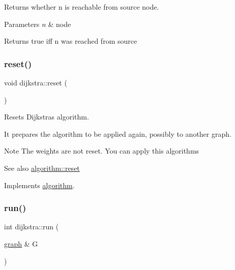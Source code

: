 Returns whether {\ttfamily n} is reachable from source node. 


\begin{DoxyParams}{Parameters}
{\em n} & node\\
\hline
\end{DoxyParams}
\begin{DoxyReturn}{Returns}
{\ttfamily true} iff {\ttfamily n} was reached from source 
\end{DoxyReturn}
\mbox{\label{classdijkstra_a444c288b3a49ec1c2973459dad55ffb3}} 
\subsubsection{\texorpdfstring{reset()}{reset()}}
{\footnotesize\ttfamily void dijkstra\+::reset (\begin{DoxyParamCaption}{ }\end{DoxyParamCaption})\hspace{0.3cm}{\ttfamily [virtual]}}



Resets Dijkstra\textquotesingle{}s algorithm. 

It prepares the algorithm to be applied again, possibly to another graph.

\begin{DoxyNote}{Note}
The weights are not reset. You can apply this algorithms
\end{DoxyNote}
\begin{DoxySeeAlso}{See also}
\mbox{\hyperlink{classalgorithm_a21aba63d066ae7897de6ca7d8425c408}{algorithm\+::reset}} 
\end{DoxySeeAlso}


Implements \mbox{\hyperlink{classalgorithm_a21aba63d066ae7897de6ca7d8425c408}{algorithm}}.

\mbox{\label{classdijkstra_a7b30f3d8ad42baae27989bc14befe0d0}} 
\subsubsection{\texorpdfstring{run()}{run()}}
{\footnotesize\ttfamily int dijkstra\+::run (\begin{DoxyParamCaption}\item[{\mbox{\hyperlink{classgraph}{graph}} \&}]{G }\end{DoxyParamCaption})\hspace{0.3cm}{\ttfamily [virtual]}}



